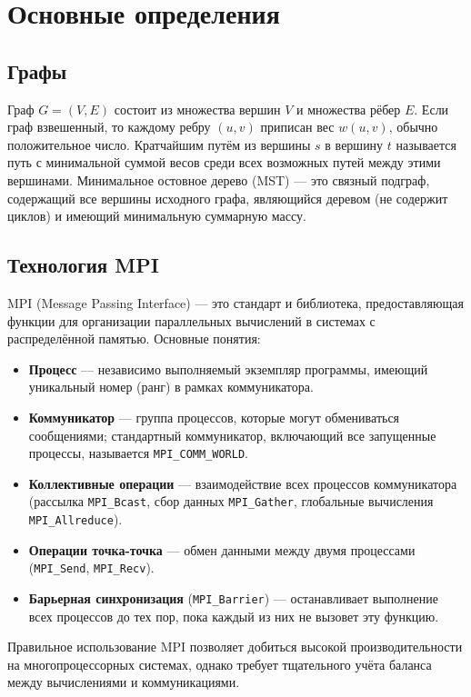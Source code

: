 \documentclass[14pt,a4paper]{article}
\begin{document}
\section{Основные определения}
\subsection{Графы}
Граф $G = (V,E)$ состоит из множества вершин $V$ и множества рёбер $E$. Если граф взвешенный, то каждому ребру $(u,v)$ приписан вес $w(u,v)$, обычно положительное число. Кратчайшим путём из вершины $s$ в вершину $t$ называется путь с минимальной суммой весов среди всех возможных путей между этими вершинами. Минимальное остовное дерево (MST) — это связный подграф, содержащий все вершины исходного графа, являющийся деревом (не содержит циклов) и имеющий минимальную суммарную массу.

\subsection{Технология MPI}
MPI (Message Passing Interface) — это стандарт и библиотека, предоставляющая функции для организации параллельных вычислений в системах с распределённой памятью. Основные понятия:
\begin{itemize}
    \item \textbf{Процесс} — независимо выполняемый экземпляр программы, имеющий уникальный номер (ранг) в рамках коммуникатора.
    \item \textbf{Коммуникатор} — группа процессов, которые могут обмениваться сообщениями; стандартный коммуникатор, включающий все запущенные процессы, называется \texttt{MPI\_COMM\_WORLD}.
    \item \textbf{Коллективные операции} — взаимодействие всех процессов коммуникатора (рассылка \texttt{MPI\_Bcast}, сбор данных \texttt{MPI\_Gather}, глобальные вычисления \texttt{MPI\_Allreduce}).
    \item \textbf{Операции точка-точка} — обмен данными между двумя процессами (\texttt{MPI\_Send}, \texttt{MPI\_Recv}).
    \item \textbf{Барьерная синхронизация} (\texttt{MPI\_Barrier}) — останавливает выполнение всех процессов до тех пор, пока каждый из них не вызовет эту функцию.
\end{itemize}
Правильное использование MPI позволяет добиться высокой производительности на многопроцессорных системах, однако требует тщательного учёта баланса между вычислениями и коммуникациями.
\end{document}
